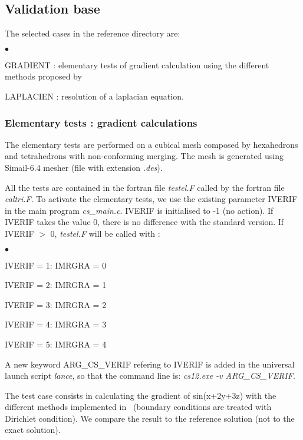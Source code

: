 \subsection{Validation base}

The selected cases in the reference directory are:
\begin{list}{$\bullet$}{}
\item GRADIENT : elementary tests of gradient calculation using the
      different methods proposed by \CS\,
\item LAPLACIEN : resolution of a laplacian equation.
\end{list}

\subsubsection{Elementary tests : gradient calculations}
The elementary tests are performed on a cubical mesh composed by
hexahedrons and tetrahedrons with non-conforming merging. The mesh is
generated using Simail-6.4 mesher (file with extension {\it .des}).

All the tests are contained in the fortran file {\it testel.F} called by
the fortran file {\it caltri.F}. To activate the elementary tests,
we use the existing parameter IVERIF in the main program {\it
cs\_main.c}. IVERIF is initialised to -1 (no action). If IVERIF takes
the value 0, there is no difference with the standard version. If
IVERIF $>$ 0, {\it testel.F} will be called with :
\begin{list}{$\bullet$}{}
\item IVERIF = 1: IMRGRA = 0
\item IVERIF = 2: IMRGRA = 1
\item IVERIF = 3: IMRGRA = 2
\item IVERIF = 4: IMRGRA = 3
\item IVERIF = 5: IMRGRA = 4
\end{list}

A new keyword ARG\_CS\_VERIF refering to IVERIF is added in the
universal launch script {\it lance}, so that the command line is:
{\it cs12.exe -v ARG\_CS\_VERIF}.

The test case consists in calculating the gradient of sin(x+2y+3z)
with the different methods implemented in \CS\ (boundary conditions
are treated with Dirichlet condition). We compare the result to the
reference solution (not to the exact solution).


